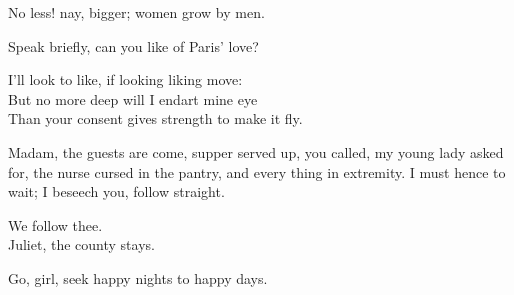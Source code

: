 \begin{speech}
No less! nay, bigger; women grow by men. \\
\end{speech}
\begin{speech}
Speak briefly, can you like of Paris' love? \\

\end{speech}
\begin{speech}
I'll look to like, if looking liking move: \\
But no more deep will I endart mine eye \\
Than your consent gives strength to make it fly. 
\\
\end{speech}
\begin{speech}
Madam, the guests are come, supper
served up, you called, my young lady asked
for, the nurse cursed in the pantry, and every
thing in extremity. I must hence to wait; I
beseech you, follow straight.
\end{speech}
\begin{speech}
We follow thee.  \\
Juliet, the county stays. \\
\end{speech}
\begin{speech}
Go, girl, seek happy nights to happy days.  \\
\end{speech}


